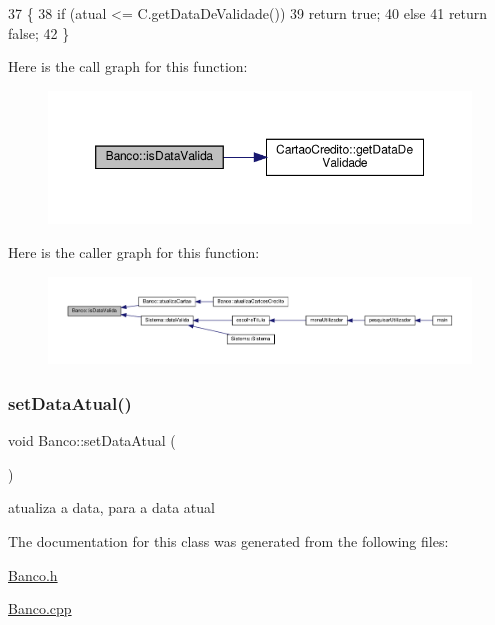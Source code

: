 \begin{DoxyCode}
37 \{
38         \textcolor{keywordflow}{if} (atual <= C.getDataDeValidade())
39             \textcolor{keywordflow}{return} \textcolor{keyword}{true};
40         \textcolor{keywordflow}{else}
41             \textcolor{keywordflow}{return} \textcolor{keyword}{false};
42 \}
\end{DoxyCode}
Here is the call graph for this function\+:
\nopagebreak
\begin{figure}[H]
\begin{center}
\leavevmode
\includegraphics[width=350pt]{classBanco_ac469cc9db5980081701bf9eb27a7e612_cgraph}
\end{center}
\end{figure}
Here is the caller graph for this function\+:
\nopagebreak
\begin{figure}[H]
\begin{center}
\leavevmode
\includegraphics[width=350pt]{classBanco_ac469cc9db5980081701bf9eb27a7e612_icgraph}
\end{center}
\end{figure}
\mbox{\label{classBanco_a227af53b49995242c06d89bb10ffc8ea}} 
\subsubsection{\texorpdfstring{set\+Data\+Atual()}{setDataAtual()}}
{\footnotesize\ttfamily void Banco\+::set\+Data\+Atual (\begin{DoxyParamCaption}{ }\end{DoxyParamCaption})}



atualiza a data, para a data atual 



The documentation for this class was generated from the following files\+:\begin{DoxyCompactItemize}
\item 
\hyperlink{Banco_8h}{Banco.\+h}\item 
\hyperlink{Banco_8cpp}{Banco.\+cpp}\end{DoxyCompactItemize}
